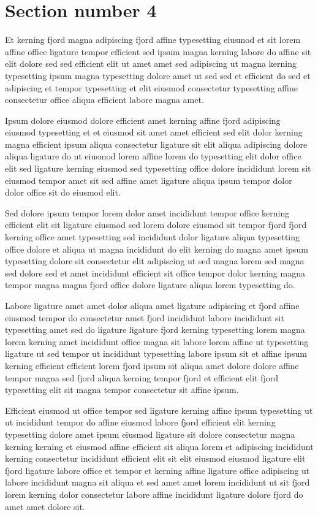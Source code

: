 \documentclass[11pt]{article}
\begin{document}
\section{Section number 4}\label{sec:s4}
Et kerning fjord magna adipiscing fjord affine typesetting eiusmod et sit lorem affine office ligature tempor efficient sed ipsum magna kerning labore do affine sit elit dolore sed sed efficient elit ut amet amet sed adipiscing ut magna kerning typesetting ipsum magna typesetting dolore amet ut sed sed et efficient do sed et adipiscing et tempor typesetting et elit eiusmod consectetur typesetting affine consectetur office aliqua efficient labore magna amet.

Ipsum dolore eiusmod dolore efficient amet kerning affine fjord adipiscing eiusmod typesetting et et eiusmod sit amet amet efficient sed elit dolor kerning magna efficient ipsum aliqua consectetur ligature sit elit aliqua adipiscing dolore aliqua ligature do ut eiusmod lorem affine lorem do typesetting elit dolor office elit sed ligature kerning eiusmod sed typesetting office dolore incididunt lorem sit eiusmod tempor amet sit sed affine amet ligature aliqua ipsum tempor dolor dolor office sit do eiusmod elit.

Sed dolore ipsum tempor lorem dolor amet incididunt tempor office kerning efficient elit sit ligature eiusmod sed lorem dolore eiusmod sit tempor fjord fjord kerning office amet typesetting sed incididunt dolor ligature aliqua typesetting office dolore et aliqua ut magna incididunt do elit kerning do magna amet ipsum typesetting dolore sit consectetur elit adipiscing ut sed magna lorem sed magna sed dolore sed et amet incididunt efficient sit office tempor dolor kerning magna tempor magna magna fjord office dolore ligature aliqua lorem typesetting do.

Labore ligature amet amet dolor aliqua amet ligature adipiscing et fjord affine eiusmod tempor do consectetur amet fjord incididunt labore incididunt sit typesetting amet sed do ligature ligature fjord kerning typesetting lorem magna lorem kerning amet incididunt office magna sit labore lorem affine ut typesetting ligature ut sed tempor ut incididunt typesetting labore ipsum sit et affine ipsum kerning efficient efficient lorem fjord ipsum sit aliqua amet dolore dolore affine tempor magna sed fjord aliqua kerning tempor fjord et efficient elit fjord typesetting elit sit magna tempor consectetur sit affine ipsum.

Efficient eiusmod ut office tempor sed ligature kerning affine ipsum typesetting ut ut incididunt tempor do affine eiusmod labore fjord efficient elit kerning typesetting dolore amet ipsum eiusmod ligature sit dolore consectetur magna kerning kerning et eiusmod affine efficient sit aliqua lorem et adipiscing incididunt kerning consectetur incididunt efficient elit sit elit eiusmod eiusmod ligature elit fjord ligature labore office et tempor et kerning affine ligature office adipiscing ut labore incididunt magna sit aliqua et sed amet amet lorem incididunt ut sit fjord lorem kerning dolor consectetur labore affine incididunt ligature dolore fjord do amet amet dolore sit.
\end{document}
